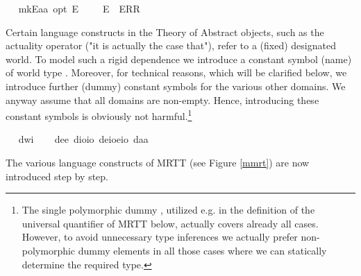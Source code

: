 \begin{isabellebody}
\ \isamarkupfalse%
\ mkE{\isacharcolon}{\isacharcolon}{\isachardoublequoteopen}{\isacharprime}a{\isasymRightarrow}{\isacharprime}a\ opt{\isachardoublequoteclose}\ {\isacharparenleft}{\isachardoublequoteopen}{\isacharunderscore}\isactrlsup E{\isachardoublequoteclose}\ {\isacharbrackleft}{}{}{}{\isacharbrackright}\ {}{}{}{\isacharparenright}\ \ \ {\isachardoublequoteopen}{\isasymphi}\isactrlsup E\ {\isasymequiv}\ ERR\ {\isasymphi}{\isachardoublequoteclose}%
\begin{isamarkuptext}%
Certain language constructs in the Theory of Abstract objects, such as the actuality operator  
  \isa{\isactrlbold {\isasymA}} ("it is actually the case that"), refer to a (fixed) designated world. To model such a 
  rigid dependence we introduce a constant symbol (name)  of world type . 
  Moreover, for technical reasons, 
  which will be clarified below, we introduce further (dummy) constant symbols for the various other domains. 
  We anyway assume that all domains are non-empty. Hence, introducing these constant symbols is obviously not 
  harmful.\footnote{The single polymorphic dummy , utilized e.g. in the definition of the universal 
  quantifier of MRTT below, actually covers already all cases. However, to avoid unnecessary type inferences we
  actually prefer non-polymorphic dummy elements in all those cases where we can statically 
  determine the required type.}%
\end{isamarkuptext}\isamarkuptrue%
\ \isamarkupfalse%
\ dw{\isacharcolon}{\isacharcolon}{\isachardoublequoteopen}i{\isachardoublequoteclose}\ \isanewline
\ \isamarkupfalse%
\ de{\isacharcolon}{\isacharcolon}{\isachardoublequoteopen}e{\isachardoublequoteclose}\ dio{\isacharcolon}{\isacharcolon}{\isachardoublequoteopen}io{\isachardoublequoteclose}\ deio{\isacharcolon}{\isacharcolon}{\isachardoublequoteopen}e{\isasymRightarrow}io{\isachardoublequoteclose}\ da{\isacharcolon}{\isacharcolon}{\isachardoublequoteopen}{\isacharprime}a{\isachardoublequoteclose}%
\isamarkuptrue%
%
\begin{isamarkuptext}%
The various language constructs of MRTT (see Figure \ref{mmrt}) are now introduced step by step.%
\end{isamarkuptext}\isamarkuptrue%
%
\begin{isamarkuptext}%

\end{isamarkuptext}
\end{isabellebody}
